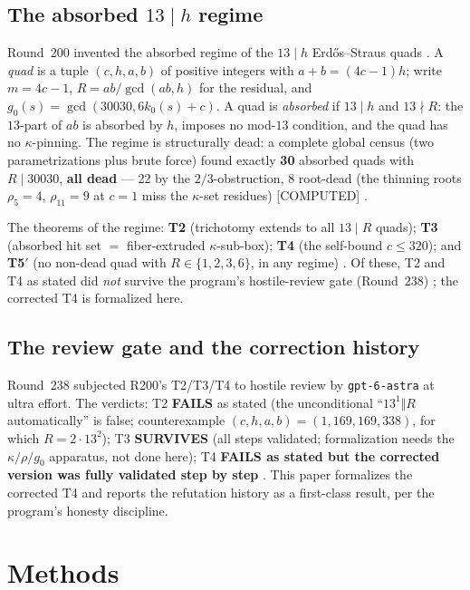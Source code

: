 \documentclass[11pt,a4paper]{article}
\theoremstyle{definition}
\begin{document}
\subsection{The absorbed $13\mid h$ regime}

Round~200 invented the absorbed regime of the $13\mid h$ Erd\H{o}s--Straus
quads \cite{D200}. A \emph{quad} is a tuple $(c,h,a,b)$ of positive
integers with $a+b=(4c-1)h$; write $m=4c-1$, $R=ab/\gcd(ab,h)$ for the
residual, and $g_0(s)=\gcd(30030,6k_0(s)+c)$. A quad is \emph{absorbed}
if $13\mid h$ and $13\nmid R$: the $13$-part of $ab$ is absorbed by
$h$, imposes no mod-$13$ condition, and the quad has no
$\kappa$-pinning. The regime is structurally dead: a complete global
census (two parametrizations plus brute force) found exactly \textbf{30}
absorbed quads with $R\mid30030$, \textbf{all dead} --- 22 by the
$2/3$-obstruction, 8 root-dead (the thinning roots $\rho_5=4$,
$\rho_{11}=9$ at $c=1$ miss the $\kappa$-set residues) [COMPUTED]
\cite{D200}.

The theorems of the regime: \textbf{T2} (trichotomy extends to all
$13\mid R$ quads); \textbf{T3} (absorbed hit set $=$ fiber-extruded
$\kappa$-sub-box); \textbf{T4} (the self-bound $c\le320$); and
\textbf{T5$'$} (no non-dead quad with $R\in\{1,2,3,6\}$, in any regime)
\cite{D200}. Of these, T2 and T4 as stated did \emph{not} survive the
program's hostile-review gate (Round~238) \cite{D238}; the corrected
T4 is formalized here.

\subsection{The review gate and the correction history}

Round~238 subjected R200's T2/T3/T4 to hostile review by
\texttt{gpt-6-astra} at ultra effort. The verdicts: T2 \textbf{FAILS}
as stated (the unconditional ``$13^1\Vert R$ automatically'' is false;
counterexample $(c,h,a,b)=(1,169,169,338)$, for which
$R=2\cdot13^2$); T3 \textbf{SURVIVES} (all steps validated; formalization
needs the $\kappa/\rho/g_0$ apparatus, not done here); T4
\textbf{FAILS as stated but the corrected version was fully validated
step by step} \cite{D238}. This paper formalizes the corrected T4 and
reports the refutation history as a first-class result, per the
program's honesty discipline.

\section{Methods}
\end{document}
